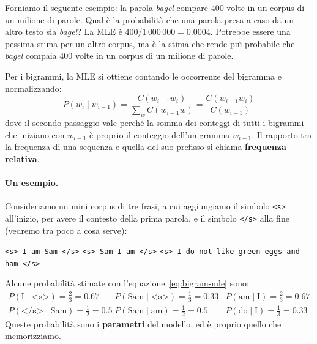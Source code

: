 Forniamo il seguente esempio: la parola \textit{bagel} compare 400 volte in un corpus di un milione di parole. Qual è la probabilità che una parola presa a caso da un altro testo sia \textit{bagel}? La MLE è $400/1\,000\,000 = 0.0004$. Potrebbe essere una pessima stima per un altro corpus, ma è la stima che rende più probabile che \textit{bagel} compaia 400 volte in un corpus di un milione di parole.

Per i bigrammi, la MLE si ottiene contando le occorrenze del bigramma e normalizzando:
\begin{equation}\label{eq:bigram-mle}
P(w_i \mid w_{i-1}) = \frac{C(w_{i-1} w_i)}{\sum_w C(w_{i-1} w)} = \frac{C(w_{i-1} w_i)}{C(w_{i-1})}
\end{equation}
dove il secondo passaggio vale perché la somma dei conteggi di tutti i bigrammi che iniziano con $w_{i-1}$ è proprio il conteggio dell'unigramma $w_{i-1}$. Il rapporto tra la frequenza di una sequenza e quella del suo prefisso si chiama \textbf{frequenza relativa}.

\paragraph{Un esempio.} Consideriamo un mini corpus di tre frasi, a cui aggiungiamo il simbolo \texttt{<s>} all'inizio, per avere il contesto della prima parola, e il simbolo \texttt{</s>} alla fine (vedremo tra poco a cosa serve):
\begin{center}
\texttt{<s> I am Sam </s>} \qquad \texttt{<s> Sam I am </s>} \qquad \texttt{<s> I do not like green eggs and ham </s>}
\end{center}
Alcune probabilità stimate con l'equazione~\eqref{eq:bigram-mle} sono:
\[
\begin{array}{lll}
P(\text{I} \mid \texttt{<s>}) = \frac{2}{3} = 0.67 & P(\text{Sam} \mid \texttt{<s>}) = \frac{1}{3} = 0.33 & P(\text{am} \mid \text{I}) = \frac{2}{3} = 0.67 \\[4pt]
P(\texttt{</s>} \mid \text{Sam}) = \frac{1}{2} = 0.5 & P(\text{Sam} \mid \text{am}) = \frac{1}{2} = 0.5 & P(\text{do} \mid \text{I}) = \frac{1}{3} = 0.33
\end{array}
\]
Queste probabilità sono i \textbf{parametri} del modello, ed è proprio quello che memorizziamo.

